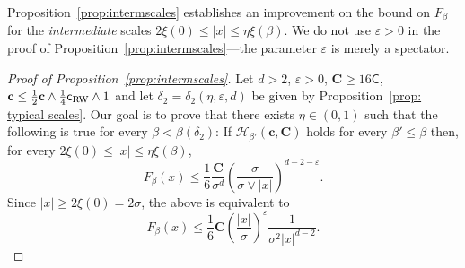 \documentclass[11pt,a4paper]{article}
\numberwithin{equation}{section}
\theoremstyle{plain}
\theoremstyle{definition}
\newcommand\1{\mathds{1}}
\newcommand\bfc{\mathbf{c}}
\newcommand\bfC{\mathbf{C}}
\newcommand\crw{\mathsf{c}_{\textup{RW}}}
\newcommand\CGreen{\mathsf{C}}
\begin{document}
Proposition~\ref{prop:intermscales} establishes an improvement on the bound on $F_\beta$ for the \emph{intermediate} scales
$2\xi(0)\leq |x|\leq \eta \xi(\beta)$.
We do not use $\varepsilon>0$ in the proof of Proposition~\ref{prop:intermscales}---the parameter
$\varepsilon$ is merely a spectator.

\begin{proof}[Proof of Proposition~\textup{\ref{prop:intermscales}}]
 Let $d>2$, $\varepsilon>0$, $\bfC\geq 16\CGreen$,  $\bfc\leq \tfrac{1}{2}\bfc\wedge \tfrac{1}{4}\crw\wedge 1$ and let
$\delta_2=\delta_2(\eta,\varepsilon,d)$ be given by
Proposition~\textup{\ref{prop: typical scales}}.
Our goal is to prove that there exists $\eta\in (0,1)$
such that the following is true for every $\beta<\beta(\delta_2)$: If $\mathcal H_{\beta'}(\bfc,\bfC)$ holds for every $\beta' \le \beta$
then, for every $2\xi(0)\leq |x|\leq \eta \xi(\beta)$,
\begin{equation}
	F_\beta(x)
    \leq
    \frac{1}{6} \frac{\bfC}{\sigma^d}
    \left(\frac{\sigma}{\sigma\vee |x|}\right)^{d-2-\varepsilon}
    .
\end{equation}
Since $|x| \ge 2\xi(0)=2\sigma$, the above is equivalent to
\begin{equation}
\label{eq:intx-want}
	F_\beta(x)
    \leq
    \frac{1}{6} \bfC \left(\frac{|x|}{\sigma}\right)^\varepsilon
    \frac{1}{\sigma^2 |x|^{d-2}}.
\end{equation}



\end{proof}
\end{document}
